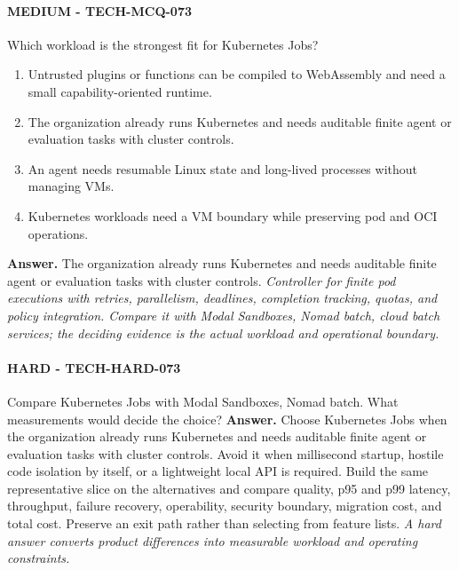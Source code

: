 \paragraph{MEDIUM - TECH-MCQ-073} Which workload is the strongest fit for Kubernetes Jobs?
\begin{enumerate}[label=\Alph*.]
\item Untrusted plugins or functions can be compiled to WebAssembly and need a small capability-oriented runtime.
\item The organization already runs Kubernetes and needs auditable finite agent or evaluation tasks with cluster controls.
\item An agent needs resumable Linux state and long-lived processes without managing VMs.
\item Kubernetes workloads need a VM boundary while preserving pod and OCI operations.
\end{enumerate}
\textbf{Answer.} The organization already runs Kubernetes and needs auditable finite agent or evaluation tasks with cluster controls.
\textit{Controller for finite pod executions with retries, parallelism, deadlines, completion tracking, quotas, and policy integration. Compare it with Modal Sandboxes, Nomad batch, cloud batch services; the deciding evidence is the actual workload and operational boundary.}
\paragraph{HARD - TECH-HARD-073} Compare Kubernetes Jobs with Modal Sandboxes, Nomad batch. What measurements would decide the choice?
\textbf{Answer.} Choose Kubernetes Jobs when the organization already runs Kubernetes and needs auditable finite agent or evaluation tasks with cluster controls. Avoid it when millisecond startup, hostile code isolation by itself, or a lightweight local API is required. Build the same representative slice on the alternatives and compare quality, p95 and p99 latency, throughput, failure recovery, operability, security boundary, migration cost, and total cost. Preserve an exit path rather than selecting from feature lists.
\textit{A hard answer converts product differences into measurable workload and operating constraints.}
